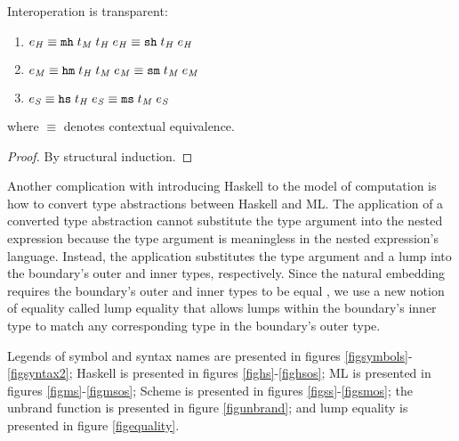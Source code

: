 \begin{theorem}{Interoperation is transparent:}
\label{thmtransparent}
\begin{enumerate}
\item $e_{\mathit{H}} \equiv \mathtt{mh} \; t_{\mathit{M}} \; t_{\mathit{H}} \; e_{\mathit{H}} \equiv \mathtt{sh} \; t_{\mathit{H}} \; e_{\mathit{H}}$
\item $e_{\mathit{M}} \equiv \mathtt{hm} \; t_{\mathit{H}} \; t_{\mathit{M}} \; e_{\mathit{M}} \equiv \mathtt{sm} \; t_{\mathit{M}} \; e_{\mathit{M}}$
\item $e_{\mathit{S}} \equiv \mathtt{hs} \; t_{\mathit{H}} \; e_{\mathit{S}} \equiv \mathtt{ms} \; t_{\mathit{M}} \; e_{\mathit{S}}$
\end{enumerate}
where $\equiv$ denotes contextual equivalence.
\begin{proof}
By structural induction.
\end{proof}
\end{theorem}

Another complication with introducing Haskell to the model of computation is how to convert type abstractions between Haskell and ML. The application of a converted type abstraction cannot substitute the type argument into the nested expression because the type argument is meaningless in the nested expression's language. Instead, the application substitutes the type argument and a lump into the boundary's outer and inner types, respectively. Since the natural embedding requires the boundary's outer and inner types to be equal \cite{matthews07}, we use a new notion of equality called lump equality that allows lumps within the boundary's inner type to match any corresponding type in the boundary's outer type.

Legends of symbol and syntax names are presented in figures \ref{figsymbols}-\ref{figsyntax2}; Haskell is presented in figures \ref{fighs}-\ref{fighsos}; ML is presented in figures \ref{figms}-\ref{figmsos}; Scheme is presented in figures \ref{figss}-\ref{figsmos}; the unbrand function is presented in figure \ref{figunbrand}; and lump equality is presented in figure \ref{figequality}.

\clearpage



\clearpage



\clearpage



\clearpage



\clearpage

